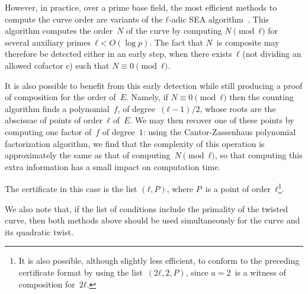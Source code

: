 \documentclass[twocolumn,letterpaper,10pt]{article}
\begin{document}
However, in practice, over a prime base field,
the most efficient methods to compute the curve order are
variants of the $ℓ$-adic SEA algorithm~\cite{mc1985schoof,
jtnb1995schoof,smf2008cl}.
This algorithm computes the order~$N$ of the curve
by computing $N \pmod{ℓ}$ for several
auxiliary primes~$ℓ < O(\log p)$.
The fact that $N$~is composite may therefore be detected
either in an early step,
when there exists~$ℓ$ (not dividing an allowed cofactor $c$)
such that $N ≡ 0 \pmod{ℓ}$.

It is also possible to benefit from this early detection
while still producing a proof of composition for the order of~$E$.
Namely, if $N ≡ 0 \pmod{ℓ}$ then
the counting algorithm finds a polynomial~$f$, of degree~$(ℓ-1)/2$,
whose roots are the abscissae of points of order~$ℓ$ of~$E$.
We may then recover one of these points by
computing one factor of~$f$ of degree~$1$:
using the Cantor-Zassenhaus polynomial factorization algorithm,
we find that the complexity of this operation
is approximately the same as that of computing~$N \pmod{ℓ}$,
so that computing this extra information
has a small impact on computation time.

The certificate in this case is the list $(ℓ, P)$,
where $P$~is a point of order~$ℓ$\footnote{%
It is also possible, although slightly less efficient,
to conform to the preceding certificate format
by using the list~$(2 ℓ, 2, P)$,
since $a = 2$~is a witness of composition for~$2ℓ$.}.

We also note that, if the list of conditions
include the primality of the twisted curve,
then both methods above should be used
simultaneously for the curve and its quadratic twist.
% 
% 
% 
\end{document}
